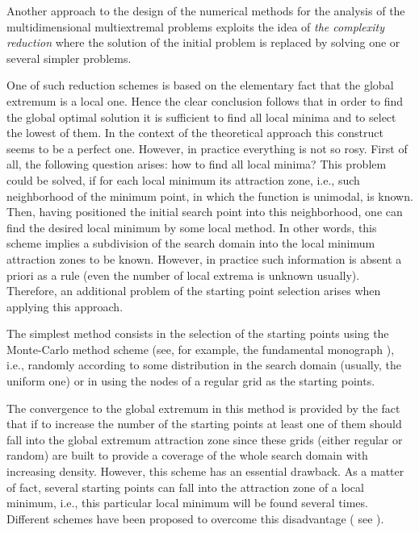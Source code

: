 Another approach to the design of the numerical methods for the analysis of the multidimensional multiextremal problems exploits the idea of \textit{the complexity reduction} where the solution of the initial problem is replaced by solving one or several simpler problems.

One of such reduction schemes is based on the elementary fact that the global extremum is a local one. Hence the clear conclusion follows that in order to find the global optimal solution it is sufficient to find all local minima and to select the lowest of them. In the context of the theoretical approach this construct seems to be a perfect one. However, in practice everything is not so rosy. 
First of all, the following question arises: how to find all local minima? This problem could be solved, if for each local minimum its attraction zone, i.e., such neighborhood of the minimum point, in which the function is unimodal, is known. Then, having positioned the initial search point into this neighborhood, one can find the desired local minimum by some local method. In other words, this scheme implies a subdivision of the search domain into the local minimum attraction zones to be known. However, in practice such information is absent a priori as a rule (even the number of local extrema is unknown usually). Therefore, an additional problem of the starting point selection arises when applying this approach. 

The simplest method consists in the selection of the starting points using the Monte-Carlo method scheme (see, for example, the fundamental monograph \cite{1_ZhigZhil}), i.e., randomly according to some distribution in the search domain (usually, the uniform one) or in using the nodes of a regular grid as the starting points.

The convergence to the global extremum in this method is provided by the fact that if to increase the number of the starting points at least one of them should fall into the global extremum attraction zone since these grids (either regular or random) are built to provide a coverage of the whole search domain with increasing density. However, this scheme has an essential drawback. As a matter of fact, several starting points can fall into the attraction zone of a local minimum, i.e., this particular local minimum will be found several times. Different schemes have been proposed to overcome this disadvantage ( see \cite{BetroSchoen, BoendeRinnooy, 1_Zielinski}). 

